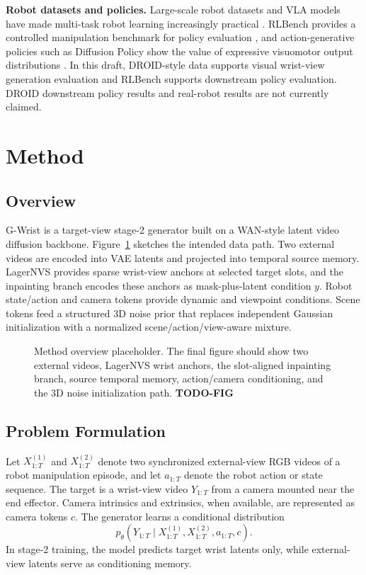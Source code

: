 \documentclass[letterpaper]{article}
\newcommand{\method}{G-Wrist}
\newcommand{\todo}[1]{\textbf{TODO-#1}}
\begin{document}
\textbf{Robot datasets and policies.}
Large-scale robot datasets and VLA models have made multi-task robot learning increasingly practical \cite{khazatsky2025droid,brohan2023rt2,kim2024openvla}.
RLBench provides a controlled manipulation benchmark for policy evaluation \cite{james2019rlbench}, and action-generative policies such as Diffusion Policy show the value of expressive visuomotor output distributions \cite{chi2024diffusionpolicy}.
In this draft, DROID-style data supports visual wrist-view generation evaluation and RLBench supports downstream policy evaluation.
DROID downstream policy results and real-robot results are not currently claimed.

\section{Method}

\subsection{Overview}

\method{} is a target-view stage-2 generator built on a WAN-style latent video diffusion backbone.
Figure~\ref{fig:pipeline} sketches the intended data path.
Two external videos are encoded into VAE latents and projected into temporal source memory.
LagerNVS provides sparse wrist-view anchors at selected target slots, and the inpainting branch encodes these anchors as mask-plus-latent condition $y$.
Robot state/action and camera tokens provide dynamic and viewpoint conditions.
Scene tokens feed a structured 3D noise prior that replaces independent Gaussian initialization with a normalized scene/action/view-aware mixture.

\begin{figure}[t]
\centering
\fbox{\rule{0pt}{0.9in}\rule{0.92\linewidth}{0pt}}
\caption{Method overview placeholder. The final figure should show two external videos, LagerNVS wrist anchors, the slot-aligned inpainting branch, source temporal memory, action/camera conditioning, and the 3D noise initialization path. \todo{FIG}}
\label{fig:pipeline}
\end{figure}

\subsection{Problem Formulation}

Let $X^{(1)}_{1:T}$ and $X^{(2)}_{1:T}$ denote two synchronized external-view RGB videos of a robot manipulation episode, and let $a_{1:T}$ denote the robot action or state sequence.
The target is a wrist-view video $Y_{1:T}$ from a camera mounted near the end effector.
Camera intrinsics and extrinsics, when available, are represented as camera tokens $c$.
The generator learns a conditional distribution
\[
    p_{\theta}(Y_{1:T}\mid X^{(1)}_{1:T}, X^{(2)}_{1:T}, a_{1:T}, c).
\]
In stage-2 training, the model predicts target wrist latents only, while external-view latents serve as conditioning memory.
\end{document}
